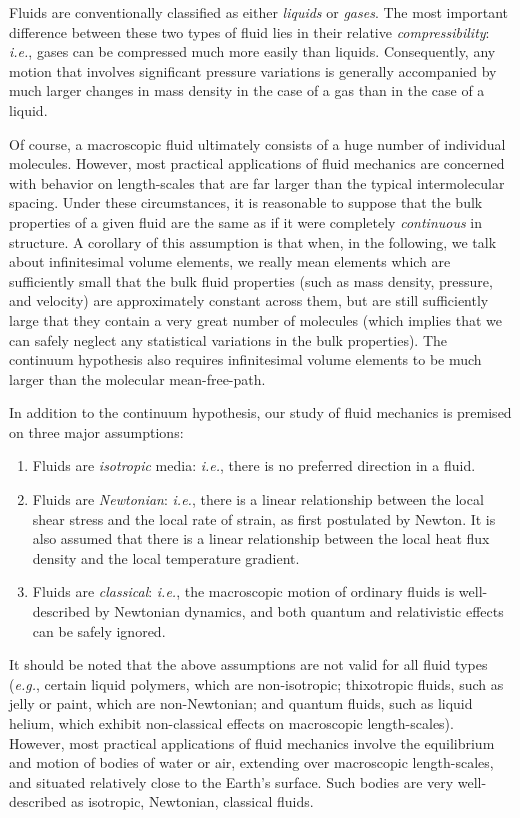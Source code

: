 Fluids are conventionally classified as either {\em liquids}\/ or {\em gases}. The most important difference
between these two types of fluid lies in their relative  {\em compressibility}: {\em i.e.}, gases can be compressed much
more easily than liquids. Consequently, any motion that involves significant pressure variations is generally accompanied by much larger changes in mass density in the case of a gas than in the
case of a liquid. 

Of course, a macroscopic fluid ultimately consists of a huge number of individual molecules. However, most practical
applications of fluid mechanics are concerned with behavior on  length-scales
that are far larger than the typical intermolecular spacing. Under these circumstances, it
is reasonable to suppose that the bulk properties of  a given fluid are the same as if
it were completely {\em continuous}\/ in structure. A corollary of this assumption is that
when, in the following, we talk about infinitesimal volume elements, we really mean elements which are
sufficiently small that the bulk fluid properties  (such as  mass density, pressure, and velocity) are approximately constant across them, but are still sufficiently large that
they contain a  very great number of molecules (which implies that we can safely neglect any statistical variations
in the bulk properties). The continuum hypothesis also requires infinitesimal volume elements to be much
larger than the molecular mean-free-path.

In addition to the continuum hypothesis, our study of fluid mechanics is premised on three major assumptions:
\begin{enumerate}
\item Fluids are {\em isotropic}\/ media: {\em i.e.}, there is no preferred direction in a fluid.
\item Fluids are {\em Newtonian}: {\em i.e.}, there is a linear relationship between the local shear stress and
the local rate of strain, as first postulated by Newton. It is also assumed that there is a linear relationship
between the local heat flux density and  the local temperature gradient. 
\item Fluids are {\em classical}: {\em i.e.}, the macroscopic motion of ordinary fluids is well-described
by Newtonian dynamics, and both quantum and relativistic effects can be safely ignored.
\end{enumerate}
It should be noted that the above assumptions are not valid for all fluid types ({\em e.g.}, certain
liquid polymers, which are non-isotropic; thixotropic
fluids, such as jelly or paint, which are non-Newtonian; and quantum fluids, such as liquid helium, which
exhibit non-classical effects on macroscopic length-scales). However, most practical
applications of fluid mechanics involve the equilibrium and motion of bodies of water or air, extending over macroscopic length-scales, and situated  relatively close to the Earth's surface. Such bodies are very well-described
as isotropic, Newtonian,  classical fluids.


